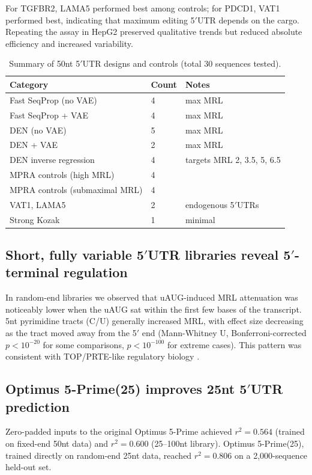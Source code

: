 \documentclass[11pt]{article}
\begin{document}
For TGFBR2, LAMA5 performed best among controls; for PDCD1, VAT1 performed best, indicating that maximum editing 5$'$UTR depends on the cargo. Repeating the assay in HepG2 preserved qualitative trends but reduced absolute efficiency and increased variability.

\begin{table}[h]
\centering
\caption{Summary of 50nt 5$'$UTR designs and controls (total 30 sequences tested).}
\begin{tabular}{lll}
\toprule
Category & Count & Notes \\
\midrule
Fast SeqProp (no VAE) & 4 & max MRL \\
Fast SeqProp + VAE & 4 & max MRL \\
DEN (no VAE) & 5 & max MRL \\
DEN + VAE & 2 & max MRL \\
DEN inverse regression & 4 & targets MRL 2, 3.5, 5, 6.5 \\
MPRA controls (high MRL) & 4 & \\
MPRA controls (submaximal MRL) & 4 & \\
VAT1, LAMA5 & 2 & endogenous 5$'$UTRs \\
Strong Kozak & 1 & minimal \\
\bottomrule
\end{tabular}
\end{table}

\subsection{Short, fully variable 5$'$UTR libraries reveal 5$'$-terminal regulation}
In random-end libraries we observed that uAUG-induced MRL attenuation was noticeably lower when the uAUG sat within the first few bases of the transcript. 5nt pyrimidine tracts (C/U) generally increased MRL, with effect size decreasing as the tract moved away from the 5$'$ end (Mann-Whitney U, Bonferroni-corrected $p < 10^{-20}$ for some comparisons, $p < 10^{-100}$ for extreme cases). This pattern was consistent with TOP/PRTE-like regulatory biology \cite{meyuhas2015substrates,hsieh2012translational}.

\subsection{Optimus 5-Prime(25) improves 25nt 5$'$UTR prediction}
Zero-padded inputs to the original Optimus 5-Prime achieved $r^2 = 0.564$ (trained on fixed-end 50nt data) and $r^2 = 0.600$ (25--100nt library). Optimus 5-Prime(25), trained directly on random-end 25nt data, reached $r^2 = 0.806$ on a 2{,}000-sequence held-out set.
\end{document}
